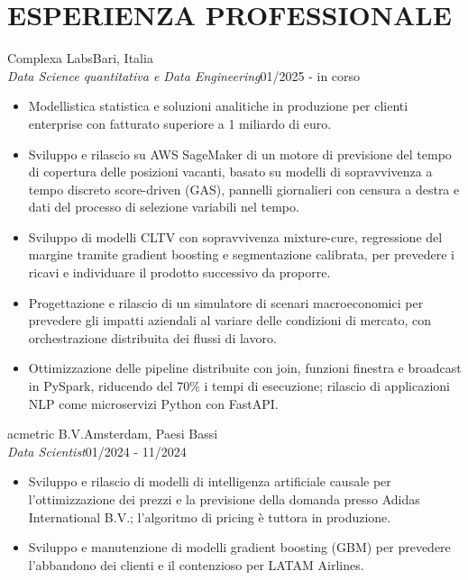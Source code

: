 \documentclass[11pt,a4paper]{article}
\newcommand{\job}[4]{\textbf{#1}\hfill #2\\\textit{#3}\hfill #4\par}
\renewcommand{\textbf}[1]{#1}
\begin{document}
\section*{ESPERIENZA PROFESSIONALE}
\job{Complexa Labs}{Bari, Italia}{Data Science quantitativa e Data Engineering}{01/2025 - in corso}
\begin{itemize}
\item Modellistica statistica e soluzioni analitiche in produzione per clienti enterprise con fatturato superiore a 1 miliardo di euro.
\item Sviluppo e rilascio su AWS SageMaker di un motore di previsione del tempo di copertura delle posizioni vacanti, basato su modelli di sopravvivenza a tempo discreto score-driven (GAS), pannelli giornalieri con censura a destra e dati del processo di selezione variabili nel tempo.
\item Sviluppo di modelli CLTV con sopravvivenza mixture-cure, regressione del margine tramite gradient boosting e segmentazione calibrata, per prevedere i ricavi e individuare il prodotto successivo da proporre.
\item Progettazione e rilascio di un simulatore di scenari macroeconomici per prevedere gli impatti aziendali al variare delle condizioni di mercato, con orchestrazione distribuita dei flussi di lavoro.
\item Ottimizzazione delle pipeline distribuite con join, funzioni finestra e broadcast in PySpark, \textbf{riducendo del 70\% i tempi di esecuzione}; rilascio di applicazioni NLP come microservizi Python con FastAPI.
\end{itemize}
\vspace{5pt}
\job{acmetric B.V.}{Amsterdam, Paesi Bassi}{Data Scientist}{01/2024 - 11/2024}
\begin{itemize}
\item Sviluppo e rilascio di modelli di intelligenza artificiale causale per l'ottimizzazione dei prezzi e la previsione della domanda presso Adidas International B.V.; l'algoritmo di pricing è tuttora in produzione.
\item Sviluppo e manutenzione di modelli gradient boosting (GBM) per prevedere l'abbandono dei clienti e il contenzioso per LATAM Airlines.
\end{itemize}
\end{document}
